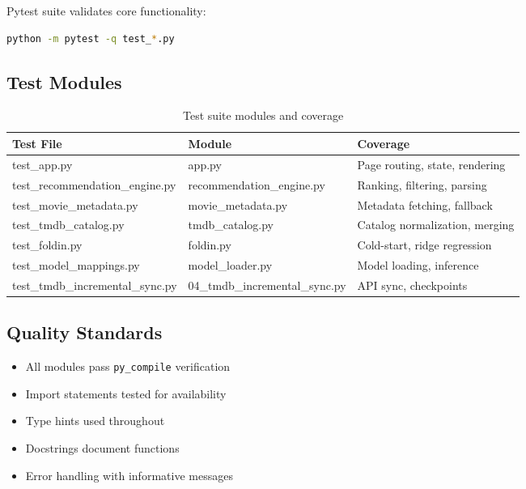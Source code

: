 \documentclass[11pt,a4paper]{article}
\begin{document}
Pytest suite validates core functionality:

\begin{lstlisting}[language=bash, caption=Run Test Suite]
python -m pytest -q test_*.py
\end{lstlisting}

\subsection{Test Modules}

\begin{table}[H]
\centering
\begin{tabular}{lll}
\toprule
\textbf{Test File} & \textbf{Module} & \textbf{Coverage} \\
\midrule
test\_app.py & app.py & Page routing, state, rendering \\
test\_recommendation\_engine.py & recommendation\_engine.py & Ranking, filtering, parsing \\
test\_movie\_metadata.py & movie\_metadata.py & Metadata fetching, fallback \\
test\_tmdb\_catalog.py & tmdb\_catalog.py & Catalog normalization, merging \\
test\_foldin.py & foldin.py & Cold-start, ridge regression \\
test\_model\_mappings.py & model\_loader.py & Model loading, inference \\
test\_tmdb\_incremental\_sync.py & 04\_tmdb\_incremental\_sync.py & API sync, checkpoints \\
\bottomrule
\end{tabular}
\caption{Test suite modules and coverage}
\label{tab:test_organization}
\end{table}

\subsection{Quality Standards}

\begin{itemize}
    \item All modules pass \texttt{py\_compile} verification
    \item Import statements tested for availability
    \item Type hints used throughout
    \item Docstrings document functions
    \item Error handling with informative messages
\end{itemize}
\end{document}
